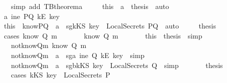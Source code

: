 \begin{isabellebody}
\ \ \ \ \ \ \isamarkupfalse \ {\isacharparenleft}simp\ add{\isacharcolon}\ TBtheorem{}a{\isacharparenright}\isanewline
\ \ \ \ \isamarkupfalse \ this\ \ a{}\ \isamarkupfalse \ {\isacharquery}thesis\ \isamarkupfalse \ auto\isanewline
\ \ \isamarkupfalse \isanewline
\ \ \ \ \isamarkupfalse \ a{}{}{\isacharcolon}{\isachardoublequoteopen}{\isasymnot}\ ine\ PQ\ {\isacharparenleft}kE\ key{\isacharparenright}{\isachardoublequoteclose}\isanewline
\ \ \ \ \isamarkupfalse \ this\ \ knowPQ\ \ a{}\ \isamarkupfalse \ sg{}{\isacharcolon}{\isachardoublequoteopen}kKS\ key\ {\isasymin}\ LocalSecrets\ PQ{\isachardoublequoteclose}\ \isamarkupfalse \ auto\isanewline
\ \ \ \ \isamarkupfalse \ {\isacharquery}thesis\ \isanewline
\ \ \ \ \isamarkupfalse \ {\isacharparenleft}cases\ {\isachardoublequoteopen}know\ Q\ m{\isachardoublequoteclose}{\isacharparenright}\isanewline
\ \ \ \ \ \ \isamarkupfalse \ {\isachardoublequoteopen}know\ Q\ m{\isachardoublequoteclose}\isanewline
\ \ \ \ \ \ \isamarkupfalse \ this\ \isamarkupfalse \ {\isacharquery}thesis\ \isamarkupfalse \ simp\isanewline
\ \ \ \ \isamarkupfalse \ \isanewline
\ \ \ \ \ \ \isamarkupfalse \ not{\isacharunderscore}knowQm{\isacharcolon}{\isachardoublequoteopen}{\isasymnot}\ know\ Q\ m{\isachardoublequoteclose}\isanewline
\ \ \ \ \ \ \isamarkupfalse \ not{\isacharunderscore}knowQm\ \ a{}\ \isamarkupfalse \ sg{}a{\isacharcolon}{\isachardoublequoteopen}{\isasymnot}\ ine\ Q\ {\isacharparenleft}kE\ key{\isacharparenright}{\isachardoublequoteclose}\ \isamarkupfalse \ simp\isanewline
\ \ \ \ \ \ \isamarkupfalse \ not{\isacharunderscore}knowQm\ \ a{}\ \isamarkupfalse \ sg{}b{\isacharcolon}{\isachardoublequoteopen}kKS\ key\ {\isasymnotin}\ LocalSecrets\ Q{\isachardoublequoteclose}\ \isamarkupfalse \ simp\isanewline
\ \ \ \ \ \ \isamarkupfalse \ {\isacharquery}thesis\isanewline
\ \ \ \ \ \ \isamarkupfalse \ {\isacharparenleft}cases\ {\isachardoublequoteopen}kKS\ key\ {\isasymin}\ LocalSecrets\ P{\isachardoublequoteclose}{\isacharparenright}\isanewline

\end{isabellebody}
